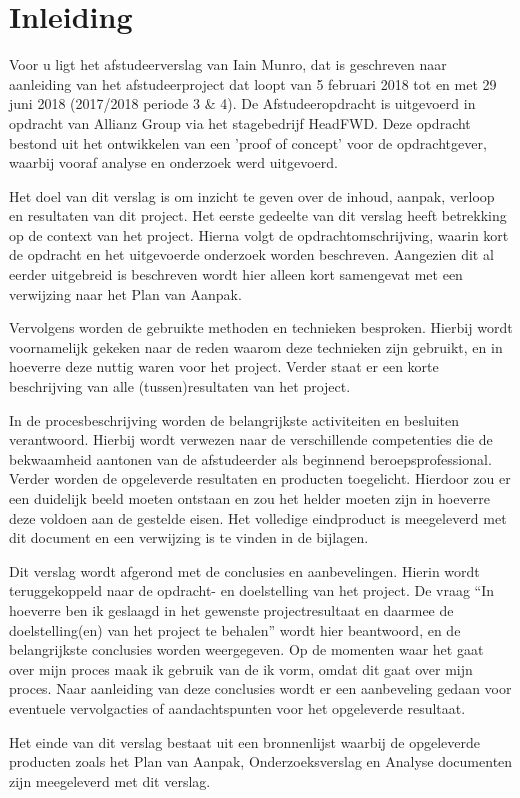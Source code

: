 \chapter{Inleiding}
Voor u ligt het afstudeerverslag van Iain Munro, dat is geschreven naar aanleiding van het afstudeerproject dat loopt van 5 februari 2018 tot en met 29 juni 2018 (2017/2018 periode 3 \& 4). De Afstudeeropdracht is uitgevoerd in opdracht van Allianz Group via het stagebedrijf HeadFWD. Deze opdracht bestond uit het ontwikkelen van een ’proof of concept’ voor de opdrachtgever, waarbij vooraf analyse en onderzoek werd uitgevoerd.
\par 
Het doel van dit verslag is om inzicht te geven over de inhoud, aanpak, verloop en resultaten van dit project. Het eerste gedeelte van dit verslag heeft betrekking op de context van het project. Hierna volgt de opdrachtomschrijving, waarin kort de opdracht en het uitgevoerde onderzoek worden beschreven. Aangezien dit al eerder uitgebreid is beschreven wordt hier alleen kort samengevat met een verwijzing naar het Plan van Aanpak.
\par
Vervolgens worden de gebruikte methoden en technieken besproken. Hierbij wordt voornamelijk gekeken naar de reden waarom deze technieken zijn gebruikt, en in hoeverre deze nuttig waren voor het project. Verder staat er een korte beschrijving van alle (tussen)resultaten van het project.
\par
In de procesbeschrijving worden de belangrijkste activiteiten en besluiten verantwoord. Hierbij wordt verwezen naar de verschillende competenties die de bekwaamheid aantonen van de afstudeerder als beginnend beroepsprofessional. Verder worden de opgeleverde resultaten en producten toegelicht. Hierdoor zou er een duidelijk beeld moeten ontstaan en zou het helder moeten zijn in hoeverre deze voldoen aan de gestelde eisen. Het volledige eindproduct is meegeleverd met dit document en een verwijzing is te vinden in de bijlagen.
\par
Dit verslag wordt afgerond met de conclusies en aanbevelingen. Hierin wordt teruggekoppeld naar de opdracht- en doelstelling van het project. De vraag “In hoeverre ben ik geslaagd in het gewenste projectresultaat en daarmee de doelstelling(en) van het project te behalen” wordt hier beantwoord, en de belangrijkste conclusies worden weergegeven. Op de momenten waar het gaat over mijn proces maak ik gebruik van de ik vorm, omdat dit gaat over mijn proces. Naar aanleiding van deze conclusies wordt er een aanbeveling gedaan voor eventuele vervolgacties of aandachtspunten voor het opgeleverde resultaat.
\par
Het einde van dit verslag bestaat uit een bronnenlijst waarbij de opgeleverde producten zoals het Plan van Aanpak, Onderzoeksverslag en Analyse documenten zijn meegeleverd met dit verslag. 
